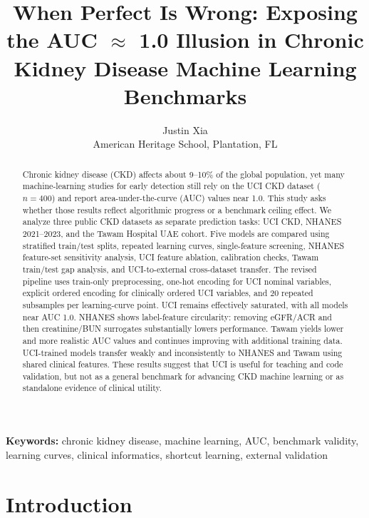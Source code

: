\documentclass[12pt]{article}
\title{\textbf{When Perfect Is Wrong: Exposing the AUC $\approx$ 1.0 Illusion in Chronic Kidney Disease Machine Learning Benchmarks}}
\author{Justin Xia\\American Heritage School, Plantation, FL}
\date{}
\begin{document}
\color{black}
\AddToShipoutPictureBG{\AtPageLowerLeft{\color{white}\rule{\paperwidth}{\paperheight}}}
\maketitle

\begin{abstract} 
Chronic kidney disease (CKD) affects about 9--10\% of the global population, yet many machine-learning studies for early detection still rely on the UCI CKD dataset ($n=400$) and report area-under-the-curve (AUC) values near 1.0. This study asks whether those results reflect algorithmic progress or a benchmark ceiling effect. We analyze three public CKD datasets as separate prediction tasks: UCI CKD, NHANES 2021--2023, and the Tawam Hospital UAE cohort. Five models are compared using stratified train/test splits, repeated learning curves, single-feature screening, NHANES feature-set sensitivity analysis, UCI feature ablation, calibration checks, Tawam train/test gap analysis, and UCI-to-external cross-dataset transfer. The revised pipeline uses train-only preprocessing, one-hot encoding for UCI nominal variables, explicit ordered encoding for clinically ordered UCI variables, and 20 repeated subsamples per learning-curve point. UCI remains effectively saturated, with all models near AUC 1.0. NHANES shows label-feature circularity: removing eGFR/ACR and then creatinine/BUN surrogates substantially lowers performance. Tawam yields lower and more realistic AUC values and continues improving with additional training data. UCI-trained models transfer weakly and inconsistently to NHANES and Tawam using shared clinical features. These results suggest that UCI is useful for teaching and code validation, but not as a general benchmark for advancing CKD machine learning or as standalone evidence of clinical utility.
\end{abstract}

\noindent\textbf{Keywords:} chronic kidney disease, machine learning, AUC, benchmark validity, learning curves, clinical informatics, shortcut learning, external validation

\section{Introduction}
\end{document}
